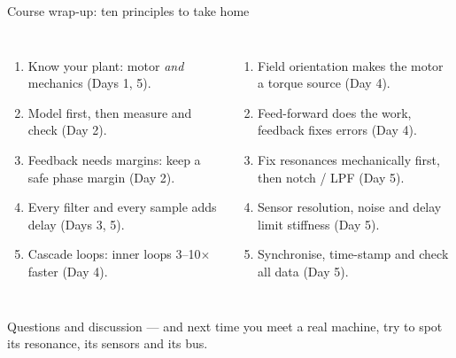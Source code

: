 \documentclass[aspectratio=169,10pt]{beamer}
\begin{document}
\begin{frame}{Course wrap-up: ten principles to take home}
\begin{columns}[T]
\begin{enumerate}\small
\item Know your plant: motor \emph{and} mechanics (Days 1, 5).
\item Model first, then measure and check (Day 2).
\item Feedback needs margins: keep a safe phase margin (Day 2).
\item Every filter and every sample adds delay (Days 3, 5).
\item Cascade loops: inner loops 3--10$\times$ faster (Day 4).
\end{enumerate}
\begin{enumerate}\small
\setcounter{enumi}{5}
\item Field orientation makes the motor a torque source (Day 4).
\item Feed-forward does the work, feedback fixes errors (Day 4).
\item Fix resonances mechanically first, then notch / LPF (Day 5).
\item Sensor resolution, noise and delay limit stiffness (Day 5).
\item Synchronise, time-stamp and check all data (Day 5).
\end{enumerate}
\end{columns}

\vspace{3mm}
\begin{keybox}
\small Questions and discussion --- and next time you meet a real machine, try to spot its resonance, its sensors and its bus.
\end{keybox}
\end{frame}
\end{document}
